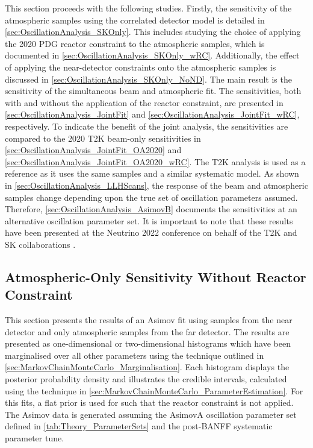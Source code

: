 This section proceeds with the following studies. Firstly, the sensitivity of the atmospheric samples using the correlated detector model is detailed in \autoref{sec:OscillationAnalysis_SKOnly}. This includes studying the choice of applying the 2020 PDG reactor constraint \cite{Particle_Data_Group2020-ms} to the atmospheric samples, which is documented in \autoref{sec:OscillationAnalysis_SKOnly_wRC}. Additionally, the effect of applying the near-detector constraints onto the atmospheric samples is discussed in \autoref{sec:OscillationAnalysis_SKOnly_NoND}. The main result is the sensitivity of the simultaneous beam and atmospheric fit. The sensitivities, both with and without the application of the reactor constraint, are presented in \autoref{sec:OscillationAnalysis_JointFit} and \autoref{sec:OscillationAnalysis_JointFit_wRC}, respectively. To indicate the benefit of the joint analysis, the sensitivities are compared to the 2020 T2K beam-only sensitivities \cite{Dunne2020-uf, t2k_tn_393} in \autoref{sec:OscillationAnalysis_JointFit_OA2020} and \autoref{sec:OscillationAnalysis_JointFit_OA2020_wRC}. The T2K analysis is used as a reference as it uses the same samples and a similar systematic model. As shown in \autoref{sec:OscillationAnalysis_LLHScans}, the response of the beam and atmospheric samples change depending upon the true set of oscillation parameters assumed. Therefore, \autoref{sec:OscillationAnalysis_AsimovB} documents the sensitivities at an alternative oscillation parameter set. It is important to note that these results have been presented at the Neutrino 2022 conference on behalf of the T2K and SK collaborations \cite{Bronner2022-wd}.

\subsection{Atmospheric-Only Sensitivity Without Reactor Constraint}
\label{sec:OscillationAnalysis_SKOnly}

This section presents the results of an Asimov fit using samples from the near detector and only atmospheric samples from the far detector. The results are presented as one-dimensional or two-dimensional histograms which have been marginalised over all other parameters using the technique outlined in \autoref{sec:MarkovChainMonteCarlo_Marginalisation}. Each histogram displays the posterior probability density and illustrates the credible intervals, calculated using the technique in \autoref{sec:MarkovChainMonteCarlo_ParameterEstimation}. For this fits, a flat prior is used for  such that the reactor constraint is not applied. The Asimov data is generated assuming the AsimovA oscillation parameter set defined in \autoref{tab:Theory_ParameterSets} and the post-BANFF systematic parameter tune.

